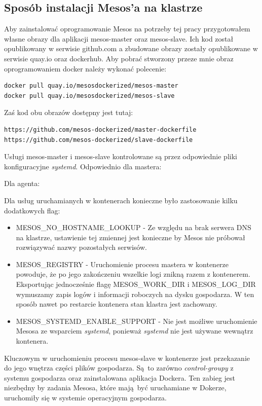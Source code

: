 \documentclass[10pt,a4paper,titlepage,twoside]{report}
\begin{document}
\subsection{Sposób instalacji Mesos'a na klastrze}
Aby zainstalować oprogramowanie Mesos na potrzeby tej pracy przygotowałem własne obrazy dla aplikacji mesos-master oraz mesos-slave. Ich kod został opublikowany w serwisie github.com a zbudowane obrazy zostały opublikowane w serwisie quay.io oraz dockerhub. Aby pobrać stworzony przeze mnie obraz oprogramowaniem docker należy wykonać polecenie:
\begin{lstlisting}
docker pull quay.io/mesosdockerized/mesos-master
docker pull quay.io/mesosdockerized/mesos-slave
\end{lstlisting}

Zaś kod obu obrazów dostępny jest tutaj:
\begin{lstlisting}
https://github.com/mesos-dockerized/master-dockerfile
https://github.com/mesos-dockerized/slave-dockerfile
\end{lstlisting}

Usługi mesos-master i mesos-slave kontrolowane są przez odpowiednie pliki konfiguracyjne \textit{systemd}. Odpowiednio dla mastera:


Dla agenta:


Dla usług uruchamianych w kontenerach konieczne było zastosowanie kilku dodatkowych flag:
\begin{itemize}
\item MESOS\_NO\_HOSTNAME\_LOOKUP - Ze względu na brak serwera DNS na klastrze, ustawienie tej zmiennej jest konieczne by Mesos nie próbował rozwiązywać nazwy pozostałych serwisów. 
\item MESOS\_REGISTRY - Uruchomienie procesu mastera w kontenerze powoduje, że po jego zakończeniu wszelkie logi znikną razem z kontenerem. Eksportując jednocześnie flagę MESOS\_WORK\_DIR i MESOS\_LOG\_DIR wymuszamy zapis logów i informacji roboczych na dysku gospodarza. W ten sposób nawet po restarcie kontenera stan klastra jest zachowany.
\item MESOS\_SYSTEMD\_ENABLE\_SUPPORT - Nie jest możliwe uruchomienie Mesosa ze wsparciem \textit{systemd}, ponieważ \textit{systemd} nie jest używane wewnątrz kontenera.
\end{itemize}
Kluczowym w uruchomieniu procesu mesos-slave w kontenerze jest przekazanie do jego wnętrza części plików gospodarza. Są to zarówno \textit{control-groupy} z systemu gospodarza oraz zainstalowana aplikacja Dockera. Ten zabieg jest niezbędny by zadania Mesosa, które mają być uruchamiane w Dokerze, uruchomiły się w systemie operacyjnym gospodarza.
\end{document}
